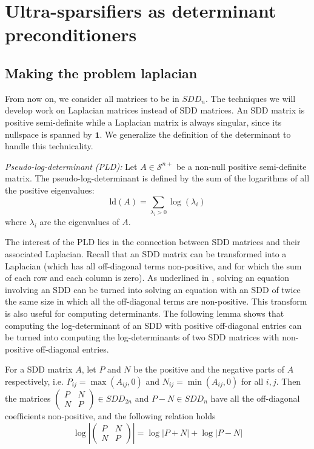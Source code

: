 
\section{Ultra-sparsifiers as determinant preconditioners}


\subsection{Making the problem laplacian}

\label{sec:Making-the-problem}

From now on, we consider all matrices to be in $SDD_{n}$. The techniques
we will develop work on Laplacian matrices instead of SDD matrices.
An SDD matrix is positive semi-definite while a Laplacian matrix is
always singular, since its nullspace is spanned by $\mathbf{1}$.
We generalize the definition of the determinant to handle this technicality.

\begin{definition} \emph{Pseudo-log-determinant (PLD):} Let $A\in\mathcal{S}^{n+}$
be a non-null positive semi-definite matrix. The pseudo-log-determinant
is defined by the sum of the logarithms of all the positive eigenvalues:
\[
\text{ld}\left(A\right)=\sum_{\lambda_{i}>0}\log\left(\lambda_{i}\right)
\]
where $\lambda_{i}$ are the eigenvalues of $A$. \end{definition}

The interest of the PLD lies in the connection between SDD matrices
and their associated Laplacian. Recall that an SDD matrix can be transformed
into a Laplacian (which has all off-diagonal terms non-positive, and
for which the sum of each row and each column is zero). As underlined
in \cite{Gremban1996}, solving an equation involving an SDD can be
turned into solving an equation with an SDD of twice the same size
in which all the off-diagonal terms are non-positive. This transform
is also useful for computing determinants. The following lemma shows
that computing the log-determinant of an SDD with positive off-diagonal
entries can be turned into computing the log-determinants of two SDD
matrices with non-positive off-diagonal entries.

\begin{lemma}\label{non-negative-conversion} For a SDD matrix $A$,
let $P$ and $N$ be the positive and the negative parts of $A$ respectively,
i.e. $P_{ij}=\max(A_{ij},0)$ and $N_{ij}=\min(A_{ij},0)$ for all
$i,j$. Then the matrices $\left(\begin{array}{cc}
P & N\\
N & P
\end{array}\right)\in SDD_{2n}$ and $P-N\in SDD_{n}$ have all the off-diagonal coefficients non-positive,
and the following relation holds 
\[
\log\left|\left(\begin{array}{cc}
P & N\\
N & P
\end{array}\right)\right|=\log\left|P+N\right|+\log\left|P-N\right|
\]
\end{lemma}

